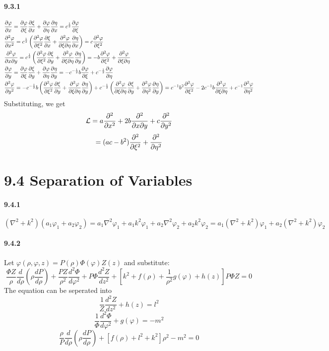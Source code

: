 \documentclass[a4paper]{article}
\begin{document}
\paragraph{9.3.1}
\begin{align*}
    & \frac{\partial\varphi}{\partial x}=\frac{\partial\varphi}{\partial\xi}\frac{\partial\xi}{\partial x}+\frac{\partial\varphi}{\partial\eta}\frac{\partial\eta}{\partial x}=c^{\frac{1}{2}}\frac{\partial\varphi}{\partial\xi}\\
    & \frac{\partial^2\varphi}{\partial x^2}=c^{\frac{1}{2}}\left(\frac{\partial^2\varphi}{\partial\xi^2}\frac{\partial\xi}{\partial x}+\frac{\partial^2\varphi}{\partial\xi\partial\eta}\frac{\partial\eta}{\partial x}\right)=c\frac{\partial^2\varphi}{\partial\xi^2}\\
    & \frac{\partial^2\varphi}{\partial x\partial y}=c^{\frac{1}{2}}\left(\frac{\partial^2\varphi}{\partial\xi^2}\frac{\partial\xi}{\partial y}+\frac{\partial^2\varphi}{\partial\xi\partial\eta}\frac{\partial\eta}{\partial y} \right)=-b\frac{\partial^2\varphi}{\partial\xi^2}+\frac{\partial^2\varphi}{\partial\xi\partial\eta}\\
    & \frac{\partial\varphi}{\partial y}=\frac{\partial\varphi}{\partial\xi}\frac{\partial\xi}{\partial y}+\frac{\partial\varphi}{\partial\eta}\frac{\partial\eta}{\partial y}=-c^{-\frac{1}{2}}b\frac{\partial\varphi}{\partial\xi}+c^{-\frac{1}{2}}\frac{\partial\varphi}{\partial\eta}\\
   & \frac{\partial^2\varphi}{\partial y^2}=-c^{-\frac{1}{2}}b\left(\frac{\partial^2\varphi}{\partial\xi^2}\frac{\partial\xi}{\partial y}+\frac{\partial^2\varphi}{\partial\xi\partial\eta}\frac{\partial\eta}{\partial y} \right)+c^{-\frac{1}{2}}\left(\frac{\partial^2\varphi}{\partial\xi\partial\eta}\frac{\partial\xi}{\partial y}+\frac{\partial^2\varphi}{\partial\eta^2}\frac{\partial\eta}{\partial y} \right)=c^{-1}b^2\frac{\partial^2\varphi}{\partial\xi^2}-2c^{-1}b\frac{\partial^2\varphi}{\partial\xi\partial\eta}+c^{-1}\frac{\partial^2\varphi}{\partial\eta^2}
\end{align*}
Substituting, we get
\[
\mathcal{L}=a\frac{\partial^2}{\partial x^2}+2b\frac{\partial^2}{\partial x\partial y}+c\frac{\partial^2}{\partial y^2}
\]
\[
=(ac-b^2)\frac{\partial^2}{\partial\xi^2}+\frac{\partial^2}{\partial\eta^2}
\]

\section*{9.4 Separation of Variables}

\paragraph{9.4.1}
\[
(\nabla^2+k^2)(a_1\varphi_1+a_2\varphi_2)=a_1\nabla^2\varphi_1+a_1k^2\varphi_1+a_2\nabla^2\varphi_2+a_2k^2\varphi_2=a_1(\nabla^2+k^2)\varphi_1+a_2(\nabla^2+k^2)\varphi_2
\]

\paragraph{9.4.2}
Let $\varphi(\rho,\varphi,z)=P(\rho)\Phi(\varphi)Z(z)$ and substitute:
\[
\frac{\Phi Z}{\rho}\frac{d}{d\rho}\left(\rho\frac{dP}{d\rho}\right)+\frac{PZ}{\rho^2}\frac{d^2\Phi}{d\varphi^2}+P\Phi\frac{d^2Z}{dz^2}+\left[k^2+f(\rho)+\frac{1}{\rho^2}g(\varphi)+h(z) \right]P\Phi Z=0
\]
The equation can be seperated into
\[
\frac{1}{Z}\frac{d^2Z}{dz^2}+h(z)=l^2
\]
\[
\frac{1}{\Phi}\frac{d^2\Phi}{d\varphi^2}+g(\varphi)=-m^2
\]
\[
\frac{\rho}{P}\frac{d}{d\rho}\left(\rho\frac{dP}{d\rho} \right)+\left[f(\rho)+l^2+k^2 \right]\rho^2-m^2=0
\]
\end{document}
